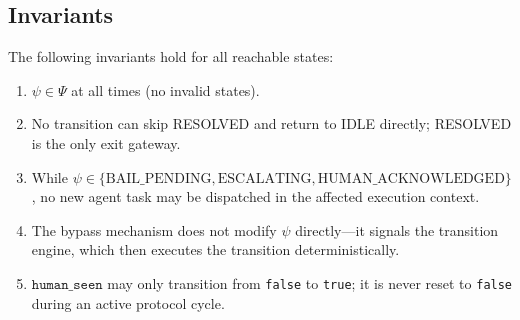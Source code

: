 \bigskip

\subsection{Invariants}

The following invariants hold for all reachable states:

\begin{enumerate}
\item $\psi \in \Psi$ at all times (no invalid states).
\item No transition can skip RESOLVED and return to IDLE directly; RESOLVED is the only exit gateway.
\item While $\psi \in \{\text{BAIL\_PENDING}, \text{ESCALATING}, \text{HUMAN\_ACKNOWLEDGED}\}$, no new agent task may be dispatched in the affected execution context.
\item The bypass mechanism does not modify $\psi$ directly—it signals the transition engine, which then executes the transition deterministically.
\item $\texttt{human\_seen}$ may only transition from \texttt{false} to \texttt{true}; it is never reset to \texttt{false} during an active protocol cycle.
\end{enumerate}
